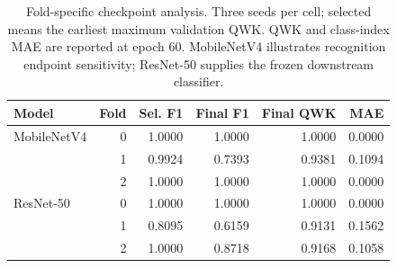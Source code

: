 \begin{table}[t]
\caption{Fold-specific checkpoint analysis. Three seeds per cell; selected means the earliest maximum validation QWK. QWK and class-index MAE are reported at epoch 60. MobileNetV4 illustrates recognition endpoint sensitivity; ResNet-50 supplies the frozen downstream classifier.}
\label{tab:fold_endpoints}
\centering\small
\setlength{\tabcolsep}{3pt}
\begin{tabular}{lrrrrr}
\toprule
Model & Fold & Sel. F1 & Final F1 & Final QWK & MAE\\
\midrule
MobileNetV4 & 0 & 1.0000 & 1.0000 & 1.0000 & 0.0000\\
 & 1 & 0.9924 & 0.7393 & 0.9381 & 0.1094\\
 & 2 & 1.0000 & 1.0000 & 1.0000 & 0.0000\\
ResNet-50 & 0 & 1.0000 & 1.0000 & 1.0000 & 0.0000\\
 & 1 & 0.8095 & 0.6159 & 0.9131 & 0.1562\\
 & 2 & 1.0000 & 0.8718 & 0.9168 & 0.1058\\
\bottomrule
\end{tabular}
\end{table}
